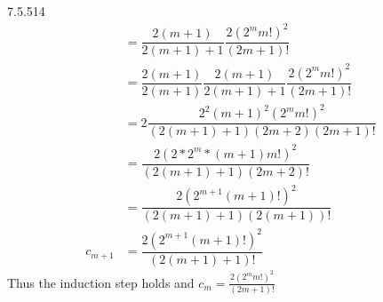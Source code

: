 \documentclass[11pt]{article}
\begin{document}
\begin{exercise}{7.5.5}{14}
{\begin{align*}
            &= \dfrac{2(m+1)}{2(m+1)+1} \dfrac{2(2^m m!)^2}{(2m+1)!} \\
            &= \dfrac{2(m+1)}{2(m+1)} \dfrac{2(m+1)}{2(m+1)+1} \dfrac{2(2^m m!)^2}{(2m+1)!} \\
            &= 2 \dfrac{2^2 (m+1)^2 (2^m m!)^2}{(2(m+1)+1)(2m+2)(2m+1)!} \\
            &= \dfrac{2 (2*2^m * (m+1)m!)^2}{(2(m+1)+1)(2m+2)!} \\
            &= \dfrac{2 (2^{m+1} (m+1)!)^2}{(2(m+1)+1)(2(m+1))!} \\
            c_{m+1} &= \dfrac{2 (2^{m+1} (m+1)!)^2}{(2(m+1)+1)!}
        \end{align*}
        Thus the induction step holds and $c_m = \frac{2(2^m m!)^2}{(2m+1)!}$
    }
\end{exercise}
\end{document}
